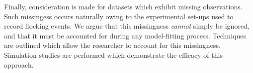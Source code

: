 \begin{center}
\begin{minipage}{0.9\textwidth}
    Finally, consideration is made for datasets which exhibit missing
    observations. Such missingess occurs naturally owing to the experimental
    set-ups used to record flocking events. We argue that this missingness
    \emph{cannot} simply be ignored, and that it must be accounted for during
    any model-fitting process. Techniques are outlined which allow the
    researcher to account for this missingness. Simulation studies
    are performed which demonstrate the efficacy of this approach. 

  \end{minipage}

\end{center}

\vfill
\cleardoublepage
